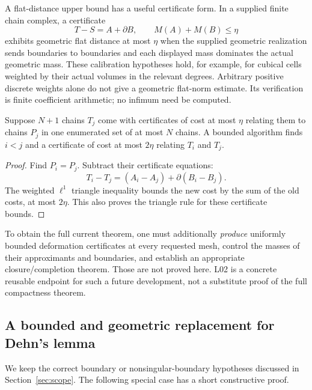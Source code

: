 A flat-distance upper bound has a useful certificate form. In a supplied finite chain complex, a certificate
\[
 T-S=A+\partial B,\qquad M(A)+M(B)\leq\eta
\]
exhibits geometric flat distance at most $\eta$ when the supplied geometric realization sends boundaries to boundaries and each displayed mass dominates the actual geometric mass. These calibration hypotheses hold, for example, for cubical cells weighted by their actual volumes in the relevant degrees. Arbitrary positive discrete weights alone do not give a geometric flat-norm estimate. Its verification is finite coefficient arithmetic; no infimum need be computed.

\begin{proposition}
Suppose $N+1$ chains $T_j$ come with certificates of cost at most $\eta$ relating them to chains $P_j$ in one enumerated set of at most $N$ chains. A bounded algorithm finds $i<j$ and a certificate of cost at most $2\eta$ relating $T_i$ and $T_j$.
\end{proposition}
\begin{proof}
Find $P_i=P_j$. Subtract their certificate equations:
\[
 T_i-T_j=(A_i-A_j)+\partial(B_i-B_j).
\]
The weighted $\ell^1$ triangle inequality bounds the new cost by the sum of the old costs, at most $2\eta$. This also proves the triangle rule for these certificate bounds.
\end{proof}

To obtain the full current theorem, one must additionally \emph{produce} uniformly bounded deformation certificates at every requested mesh, control the masses of their approximants and boundaries, and establish an appropriate closure/completion theorem. Those are not proved here. L02 is a concrete reusable endpoint for such a future development, not a substitute proof of the full compactness theorem.

\subsection{A bounded and geometric replacement for Dehn's lemma}

We keep the correct boundary or nonsingular-boundary hypotheses discussed in Section~\ref{sec:scope}. The following special case has a short constructive proof.

